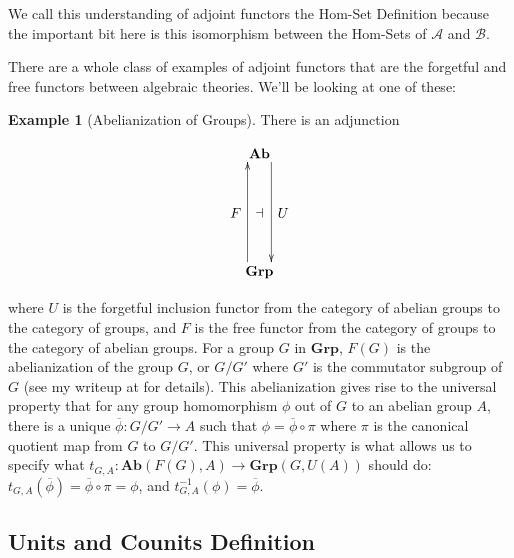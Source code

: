 \documentclass[11pt]{article}
\theoremstyle{definition}
\theoremstyle{definition}
\newtheorem*{ex}{Example}
\theoremstyle{plain}
\theoremstyle{plain}
\theoremstyle{plain}
\begin{document}
 We call this understanding of adjoint functors the Hom-Set Definition because the important bit here is this isomorphism between the Hom-Sets of $\mathscr{A}$ and $\mathscr{B}$.
 
There are a whole class of examples of adjoint functors that are the forgetful and free functors between algebraic theories. We'll be looking at one of these:
 
 \begin{ex}[Abelianization of Groups]
 There is an adjunction
 
 \begin{equation*}
 \begin{xy}
 (0,0)*+{\textbf{Ab}}="ab"; (0,-30)*+{\textbf{Grp}}="grp";
 {\ar@<2.ex> "ab";"grp"}?*!/_3mm/{U}?*!/^3mm/{\dashv};
 {\ar@<2.ex> "grp";"ab"}?*!/_3mm/{F};
 \end{xy}
 \end{equation*}
 \end{ex}
 
 where $U$ is the forgetful inclusion functor from the category of abelian groups to the category of groups, and $F$ is the free functor from the category of groups to the category of abelian groups. For a group $G$ in $\textbf{Grp}$, $F(G)$ is the abelianization of the group $G$, or $G/G'$ where $G'$ is the commutator subgroup of $G$ (see my writeup at \cite{liu_abelianization_2018} for details). This abelianization gives rise to the universal property that for any group homomorphism $\phi$ out of $G$ to an abelian group $A$, there is a unique $\overline{\phi}: G/G' \to A$ such that $\phi = \overline{\phi} \circ \pi$ where $\pi$ is the canonical quotient map from $G$ to $G/G'$. This universal property is what allows us to specify what $t_{G,A}: \textbf{Ab}(F(G), A) \to \textbf{Grp}(G, U(A))$ should do: $t_{G,A}(\overline{\phi}) = \overline{\phi} \circ \pi = \phi$, and $t^{-1}_{G,A}(\phi) = \overline{\phi}$.
 
 \subsection*{Units and Counits Definition}
 
 \nocite{*}
 
 
\end{document}
